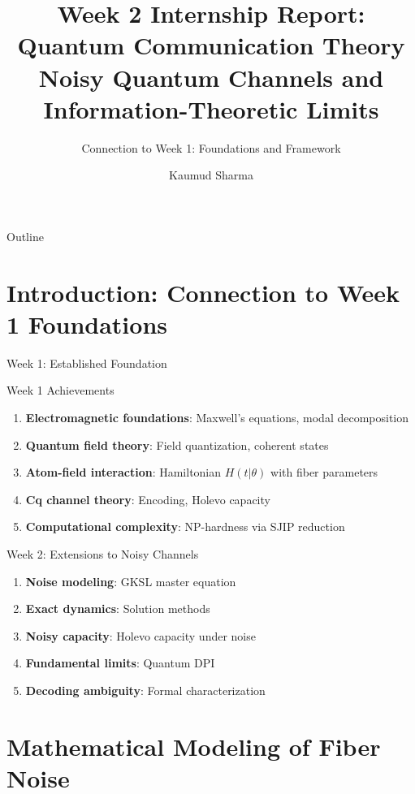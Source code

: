 \documentclass{beamer}
\title[Week 2 Report]{Week 2 Internship Report: \\ Quantum Communication Theory \\ \small Noisy Quantum Channels and Information-Theoretic Limits}
\subtitle{Connection to Week 1: Foundations and Framework}
\author{Kaumud Sharma}
\institute{}
\date{}
\theoremstyle{definition}
\theoremstyle{plain}
\begin{document}
\begin{frame}
    \titlepage
\end{frame}

\begin{frame}{Outline}
    \tableofcontents
\end{frame}

\section{Introduction: Connection to Week 1 Foundations}

\begin{frame}{Week 1: Established Foundation}
    \begin{block}{Week 1 Achievements}
        \begin{enumerate}
            \item \textbf{Electromagnetic foundations}: Maxwell's equations, modal decomposition
            \item \textbf{Quantum field theory}: Field quantization, coherent states
            \item \textbf{Atom-field interaction}: Hamiltonian $H(t|\theta)$ with fiber parameters
            \item \textbf{Cq channel theory}: Encoding, Holevo capacity
            \item \textbf{Computational complexity}: NP-hardness via SJIP reduction
        \end{enumerate}
    \end{block}
    
    \begin{block}{Week 2: Extensions to Noisy Channels}
        \begin{enumerate}
            \item \textbf{Noise modeling}: GKSL master equation
            \item \textbf{Exact dynamics}: Solution methods
            \item \textbf{Noisy capacity}: Holevo capacity under noise
            \item \textbf{Fundamental limits}: Quantum DPI
            \item \textbf{Decoding ambiguity}: Formal characterization
        \end{enumerate}
    \end{block}
\end{frame}

\section{Mathematical Modeling of Fiber Noise}
\end{document}
